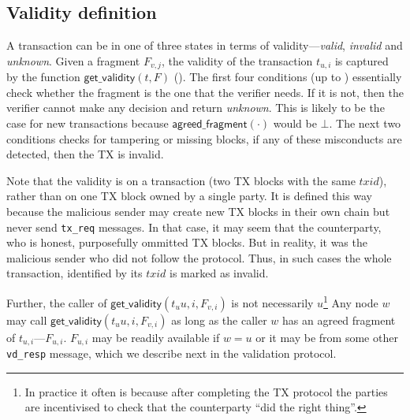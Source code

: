 \subsection{Validity definition}
A transaction can be in one of three states in terms of validity---\emph{valid}, \emph{invalid} and \emph{unknown}.
Given a fragment $F_{v, j}$, the validity of the transaction $t_{u, i}$ is captured by the function $\textsf{get\_validity}(t, F)$ ().
The first four conditions (up to ) essentially check whether the fragment is the one that the verifier needs.
If it is not, then the verifier cannot make any decision and return \emph{unknown}.
This is likely to be the case for new transactions because $\textsf{agreed\_fragment}(\cdot)$ would be $\bot$.
The next two conditions checks for tampering or missing blocks, if any of these misconducts are detected, then the TX is invalid.

Note that the validity is on a transaction (two TX blocks with the same $txid$), rather than on one TX block owned by a single party.
It is defined this way because the malicious sender may create new TX blocks in their own chain but never send \texttt{tx\_req} messages.
In that case, it may seem that the counterparty, who is honest, purposefully ommitted TX blocks.
But in reality, it was the malicious sender who did not follow the protocol.
Thus, in such cases the whole transaction, identified by its $txid$ is marked as invalid.

Further, the caller of $\textsf{get\_validity}(t_u{u, i}, F_{v, i})$ is not necessarily 
$u$\footnote{In practice it often is because after completing the TX protocol the parties are incentivised to check that the counterparty ``did the right thing''.}
Any node $w$ may call $\textsf{get\_validity}(t_u{u, i}, F_{v, i})$ as long as the caller $w$ has an agreed fragment of $t_{u, i}$---$F_{u, i}$.
$F_{u, i}$ may be readily available if $w = u$ or it may be from some other \texttt{vd\_resp} message, which we describe next in the validation protocol.

